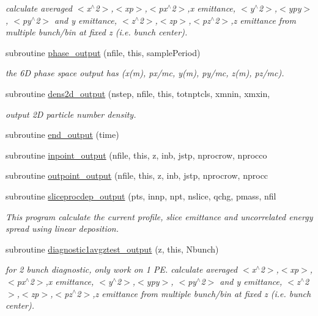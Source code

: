\begin{DoxyCompactItemize}
\begin{DoxyCompactList}\small\item\em calculate averaged $<$x$^\wedge$2$>$,$<$xp$>$,$<$px$^\wedge$2$>$,x emittance, $<$y$^\wedge$2$>$,$<$ypy$>$, $<$py$^\wedge$2$>$ and y emittance, $<$z$^\wedge$2$>$,$<$zp$>$,$<$pz$^\wedge$2$>$,z emittance from multiple bunch/bin at fixed z (i.\+e. bunch center). \end{DoxyCompactList}\item 
subroutine \mbox{\hyperlink{namespaceoutputclass_a86742b646a584647da7837ee6fc09c89}{phase\+\_\+output}} (nfile, this, sample\+Period)
\begin{DoxyCompactList}\small\item\em the 6D phase space output has (x(m), px/mc, y(m), py/mc, z(m), pz/mc). \end{DoxyCompactList}\item 
subroutine \mbox{\hyperlink{namespaceoutputclass_ab7f55098e75e7410bbbb6ffa50148508}{dens2d\+\_\+output}} (nstep, nfile, this, totnptcls, xmnin, xmxin,
\begin{DoxyCompactList}\small\item\em output 2D particle number density. \end{DoxyCompactList}\item 
subroutine \mbox{\hyperlink{namespaceoutputclass_af40e04d104fbdb28b9cae7fb5fcba121}{end\+\_\+output}} (time)
\item 
subroutine \mbox{\hyperlink{namespaceoutputclass_a9fcc4b33aa3d9bee76ef32e6708293b1}{inpoint\+\_\+output}} (nfile, this, z, inb, jstp, nprocrow, nprocco
\item 
subroutine \mbox{\hyperlink{namespaceoutputclass_a14e60e5c44149548fa7843b51c625969}{outpoint\+\_\+output}} (nfile, this, z, inb, jstp, nprocrow, nprocc
\item 
subroutine \mbox{\hyperlink{namespaceoutputclass_aaba51e45761070d95883093a25e402c4}{sliceprocdep\+\_\+output}} (pts, innp, npt, nslice, qchg, pmass, nfil
\begin{DoxyCompactList}\small\item\em This program calculate the current profile, slice emittance and uncorrelated energy spread using linear deposition. \end{DoxyCompactList}\item 
subroutine \mbox{\hyperlink{namespaceoutputclass_a17a23eedc331f6e6b2ca0543119aca42}{diagnostic1avgztest\+\_\+output}} (z, this, Nbunch)
\begin{DoxyCompactList}\small\item\em for 2 bunch diagnostic, only work on 1 PE. calculate averaged $<$x$^\wedge$2$>$,$<$xp$>$,$<$px$^\wedge$2$>$,x emittance, $<$y$^\wedge$2$>$,$<$ypy$>$, $<$py$^\wedge$2$>$ and y emittance, $<$z$^\wedge$2$>$,$<$zp$>$,$<$pz$^\wedge$2$>$,z emittance from multiple bunch/bin at fixed z (i.\+e. bunch center). \end{DoxyCompactList}\end{DoxyCompactItemize}


